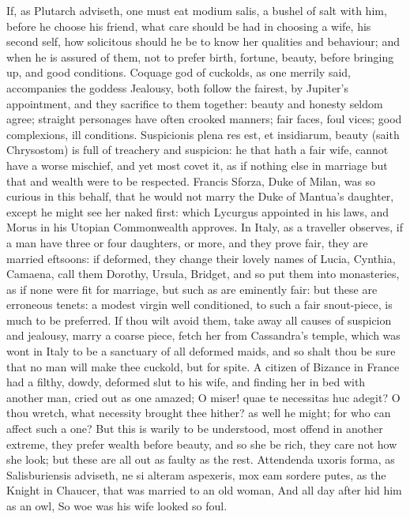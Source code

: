 {If, as Plutarch adviseth, one must eat modium salis, a bushel of salt
with him, before he choose his friend, what care should be had in
choosing a wife, his second self, how solicitous should he be to know
her qualities and behaviour; and when he is assured of them, not to
prefer birth, fortune, beauty, before bringing up, and good conditions.
Coquage god of cuckolds, as one merrily said, accompanies the
goddess Jealousy, both follow the fairest, by Jupiter's appointment,
and they sacrifice to them together: beauty and honesty seldom agree;
straight personages have often crooked manners; fair faces, foul vices;
good complexions, ill conditions. Suspicionis plena res est, et
insidiarum, beauty (saith Chrysostom) is full of treachery and
suspicion: he that hath a fair wife, cannot have a worse mischief, and
yet most covet it, as if nothing else in marriage but that and wealth
were to be respected. Francis Sforza, Duke of Milan, was so
curious in this behalf, that he would not marry the Duke of Mantua's
daughter, except he might see her naked first: which Lycurgus appointed
in his laws, and Morus in his Utopian Commonwealth approves. In
Italy, as a traveller observes, if a man have three or four daughters,
or more, and they prove fair, they are married eftsoons: if deformed,
they change their lovely names of Lucia, Cynthia, Camaena, call them
Dorothy, Ursula, Bridget, and so put them into monasteries, as if none
were fit for marriage, but such as are eminently fair: but these are
erroneous tenets: a modest virgin well conditioned, to such a fair
snout-piece, is much to be preferred. If thou wilt avoid them, take
away all causes of suspicion and jealousy, marry a coarse piece, fetch
her from Cassandra's temple, which was wont in Italy to be a
sanctuary of all deformed maids, and so shalt thou be sure that no man
will make thee cuckold, but for spite. A citizen of Bizance in France
had a filthy, dowdy, deformed slut to his wife, and finding her in bed
with another man, cried out as one amazed; O miser! quae te necessitas
huc adegit? O thou wretch, what necessity brought thee hither? as well
he might; for who can affect such a one? But this is warily to be
understood, most offend in another extreme, they prefer wealth before
beauty, and so she be rich, they care not how she look; but these are
all out as faulty as the rest. Attendenda uxoris forma, as
Salisburiensis adviseth, ne si alteram aspexeris, mox eam sordere
putes, as the Knight in Chaucer, that was married to an old woman,
And all day after hid him as an owl,
So woe was his wife looked so foul.

}
